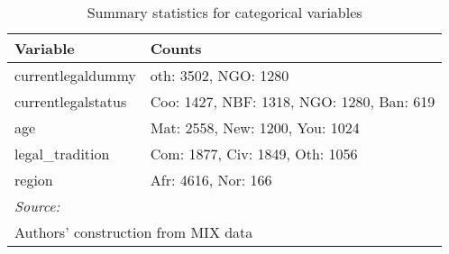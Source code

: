 \documentclass[a4paper,nobind]{templates/ociamthesis}
\begin{document}
\begin{table}

\caption{\label{tab:unnamed-chunk-16}Summary statistics for categorical variables}
\centering
\begin{tabular}[t]{ll}
\toprule
Variable & Counts\\
\midrule
currentlegaldummy & oth: 3502, NGO: 1280\\
currentlegalstatus & Coo: 1427, NBF: 1318, NGO: 1280, Ban: 619\\
age & Mat: 2558, New: 1200, You: 1024\\
legal\_tradition & Com: 1877, Civ: 1849, Oth: 1056\\
region & Afr: 4616, Nor: 166\\
\bottomrule
\multicolumn{2}{l}{\rule{0pt}{1em}\textit{Source: }}\\
\multicolumn{2}{l}{\rule{0pt}{1em}Authors' construction from MIX data}\\
\end{tabular}
\end{table}
\end{document}
